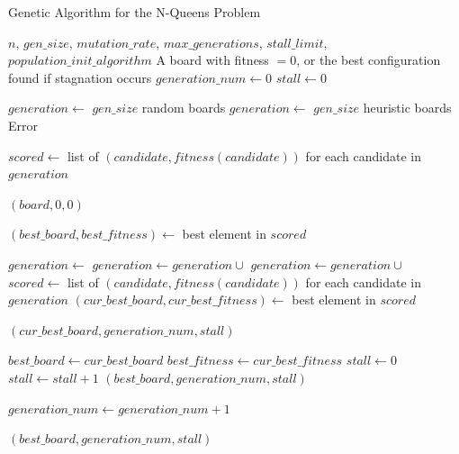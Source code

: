 \documentclass{scrartcl}
\begin{document}
\begin{algorithm}[H]
\caption{Genetic Algorithm for the N-Queens Problem}\label{alg:nqueens}
\begin{algorithmic}
\Require $n$, $gen\_size$, $mutation\_rate$, $max\_generations$, $stall\_limit$, $population\_init\_algorithm$
\Ensure A board with fitness $=0$, or the best configuration found if stagnation occurs
\State $generation\_num \gets 0$
\State $stall \gets 0$

    \State $generation \gets$ $gen\_size$ random boards
    \State $generation \gets$ $gen\_size$ heuristic boards
\Else
    \State \Return Error
\EndIf

\State $scored \gets$ list of $(candidate, fitness(candidate))$ for each candidate in $generation$

        \State \Return $(board, 0, 0)$ 
    \EndIf
\EndFor

\State $(best\_board, best\_fitness) \gets$ best element in $scored$

    \State $generation \gets$ 
    \State $generation \gets generation \cup$ 
    \State $generation \gets generation \cup$ 
    \State $scored \gets$ list of $(candidate, fitness(candidate))$ for each candidate in $generation$
    \State $(cur\_best\_board, cur\_best\_fitness) \gets$ best element in $scored$

        \State \Return $(cur\_best\_board, generation\_num, stall)$
    \EndIf

        \State $best\_board \gets cur\_best\_board$
        \State $best\_fitness \gets cur\_best\_fitness$
        \State $stall \gets 0$
    \Else
        \State $stall \gets stall + 1$
            \State \Return $(best\_board, generation\_num, stall)$
        \EndIf
    \EndIf

    \State $generation\_num \gets generation\_num + 1$
\EndWhile

\State \Return $(best\_board, generation\_num, stall)$
\end{algorithmic}
\end{algorithm}
\end{document}
